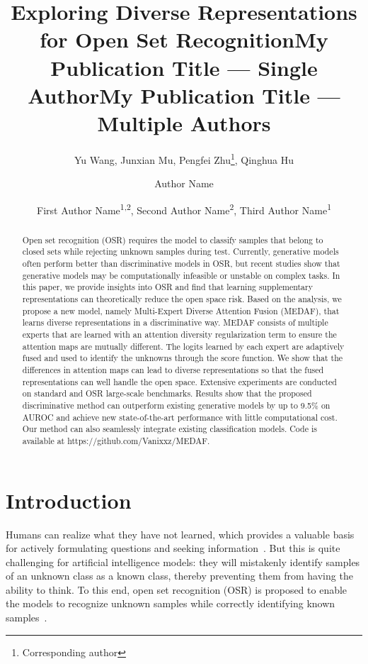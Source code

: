 \documentclass[letterpaper]{article} %
\title{Exploring Diverse Representations for Open Set Recognition}
\author{
    Yu Wang,
    Junxian Mu,
    Pengfei Zhu\thanks{Corresponding author},
    Qinghua Hu
}
\title{My Publication Title --- Single Author}
\author {
    Author Name
}
\title{My Publication Title --- Multiple Authors}
\author {
    First Author Name\textsuperscript{\rm 1,\rm 2},
    Second Author Name\textsuperscript{\rm 2},
    Third Author Name\textsuperscript{\rm 1}
}
\begin{document}
\maketitle
\begin{abstract}
Open set recognition (OSR) requires the model to classify samples that belong to closed sets while rejecting unknown samples during test. Currently, generative models often perform better than discriminative models in OSR, but recent studies show that generative models may be computationally infeasible or unstable on complex tasks. In this paper, we provide insights into OSR and find that learning supplementary representations can theoretically reduce the open space risk. Based on the analysis, we propose a new model, namely Multi-Expert Diverse Attention Fusion (MEDAF), that learns diverse representations in a discriminative way. MEDAF consists of multiple experts that are learned with an attention diversity regularization term to ensure the attention maps are mutually different. The logits learned by each expert are adaptively fused and used to identify the unknowns through the score function. We show that the differences in attention maps can lead to diverse representations so that the fused representations can well handle the open space. Extensive experiments are conducted on standard and OSR large-scale benchmarks. Results show that the proposed discriminative method can outperform existing generative models by up to 9.5\% on AUROC and achieve new state-of-the-art performance with little computational cost. Our method can also seamlessly integrate existing classification models. Code is available at https://github.com/Vanixxz/MEDAF.
\end{abstract}

\section{Introduction}
Humans can realize what they have not learned, which provides a valuable basis for actively formulating questions and seeking information~\cite{markman1979realizing}. But this is quite challenging for artificial intelligence models: they will mistakenly identify samples of an unknown class as a known class, thereby preventing them from having the ability to think. To this end, open set recognition (OSR) is proposed to enable the models to recognize unknown samples while correctly identifying known samples~\cite{scheirer2013open}.
\end{document}
